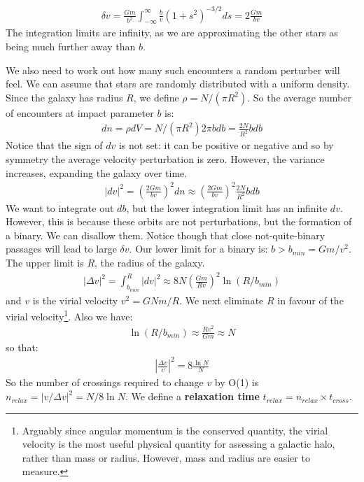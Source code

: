 \documentclass[12pt]{article}
\begin{document}
\begin{align}
\delta v = \frac{G m}{b^2} \int^\infty_{-\infty} \frac{b}{v} (1 + s^2)^{-3/2} ds = 2\frac{G m}{b v}
\end{align}
The integration limits are infinity, as we are approximating the other stars as being much further away than $b$.

We also need to work out how many such encounters a random perturber will feel. We can assume that stars are randomly distributed with a uniform density. Since the galaxy has radius $R$, we define $\rho = N / (\pi R^2)$. So the average number of encounters at impact parameter $b$ is:
\begin{align}
 dn = \rho dV = N / (\pi R^2) 2 \pi b db = \frac{2 N}{R^2} b db
\end{align}
Notice that the sign of $dv$ is not set: it can be positive or negative and so by symmetry the average velocity perturbation is zero. However, the variance increases, expanding the galaxy over time.
\begin{align}
 |d v |^2 = \left(\frac{2 G m}{b v}\right)^2 dn \approx \left(\frac{2 G m}{b v}\right)^2 \frac{2 N}{R^2} b db
\end{align}
We want to integrate out $db$, but the lower integration limit has an infinite $dv$. However, this is because these orbits are not perturbations, but the formation of a binary. We can disallow them. Notice though that close not-quite-binary passages will lead to large $\delta v$. Our lower limit for a binary is: $b > b_{min} = G m / v^2$. The upper limit is $R$, the radius of the galaxy.
\begin{align}
 |\Delta v |^2 = \int^R_{b_{min}} |dv|^2 \approx 8 N \left(\frac{G m}{R v}\right)^2 \ln (R/b_{min})
\end{align}
and $v$ is the virial velocity $v^2 = G N m / R$. We next eliminate $R$ in favour of the virial velocity\footnote{Arguably since angular momentum is the conserved quantity, the virial velocity is the most useful physical quantity for assessing a galactic halo, rather than mass or radius. However, mass and radius are easier to measure.}. Also we have:
\begin{align}
\ln (R/b_{min}) \approx \frac{R v^2}{G m} \approx N
\end{align}
so that:
\begin{align}
 \left|\frac{\Delta v}{v} \right|^2 = 8 \frac{\ln N }{N}
\end{align}
So the number of crossings required to change $v$ by O(1) is $n_{relax} = \left|v / \Delta v \right|^2  = N / 8 \ln N$.
We define a \textbf{relaxation time} $t_{relax} = n_{relax} \times t_{cross}$.
\end{document}
